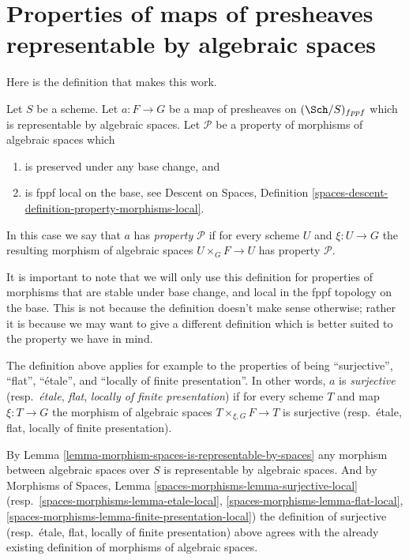 \section{Properties of maps of presheaves representable by algebraic spaces}
\label{section-representable-by-spaces-properties}

\noindent
Here is the definition that makes this work.

\begin{definition}
\label{definition-property-transformation}
Let $S$ be a scheme. Let $a : F \to G$ be a map of presheaves on
$(\Sch/S)_{fppf}$ which is representable by algebraic spaces.
Let $\mathcal{P}$ be a property of morphisms of algebraic spaces which
\begin{enumerate}
\item is preserved under any base change, and
\item is fppf local on the base, see
Descent on Spaces,
Definition \ref{spaces-descent-definition-property-morphisms-local}.
\end{enumerate}
In this case we say that $a$ has {\it property $\mathcal{P}$} if for every
scheme $U$ and $\xi : U \to G$ the resulting morphism of algebraic spaces
$U \times_G F \to U$ has property $\mathcal{P}$.
\end{definition}

\noindent
It is important to note that we will only use this definition for
properties of morphisms that are stable under base change, and
local in the fppf topology on the base. This is
not because the definition doesn't make sense otherwise; rather it
is because we may want to give a different definition which is
better suited to the property we have in mind.

\medskip\noindent
The definition above applies for example to the properties of being
``surjective'', ``flat'', ``\'etale'', and ``locally of finite presentation''.
In other words, $a$ is {\it surjective} (resp.\ {\it \'etale}, {\it flat},
{\it locally of finite presentation})
if for every scheme $T$ and map $\xi : T \to G$
the morphism of algebraic spaces $T \times_{\xi, G} F \to T$
is surjective (resp.\ \'etale, flat, locally of finite presentation).

\medskip\noindent
By
Lemma \ref{lemma-morphism-spaces-is-representable-by-spaces}
any morphism between algebraic spaces over $S$ is representable by algebraic
spaces. And by
Morphisms of Spaces,
Lemma \ref{spaces-morphisms-lemma-surjective-local}
(resp.\ \ref{spaces-morphisms-lemma-etale-local},
\ref{spaces-morphisms-lemma-flat-local},
\ref{spaces-morphisms-lemma-finite-presentation-local})
the definition of surjective (resp.\ \'etale, flat,
locally of finite presentation)
above agrees with the already existing definition of morphisms
of algebraic spaces.

